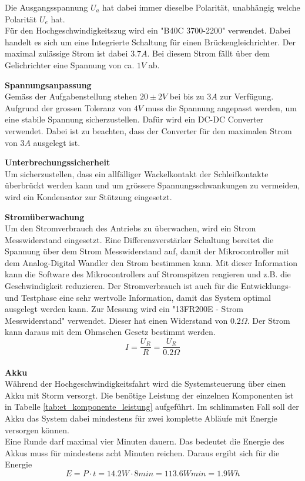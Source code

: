\documentclass[../../main.tex]{subfiles}
\begin{document}
    Die Ausgangsspannung $U_a$ hat dabei immer dieselbe Polarität, unabhängig welche Polarität $U_e$ hat. \\
    Für den Hochgeschwindigkeitszug wird ein "B40C 3700-2200"  verwendet. Dabei handelt es sich um eine Integrierte Schaltung für einen Brückengleichrichter. Der maximal zulässige Strom ist dabei $3.7A$. Bei diesem Strom fällt über dem Gelichrichter eine Spannung von ca. $1V$ ab.

    \textbf{Spannungsanpassung}\\
    Gemäss der Aufgabenstellung stehen $20\pm2V$ bei bis zu $3A$ zur Verfügung. Aufgrund der grossen Toleranz von $4V$ muss die Spannung angepasst werden, um eine stabile Spannung sicherzustellen. Dafür wird ein DC-DC Converter verwendet. Dabei ist zu beachten, dass der Converter für den maximalen Strom von $3A$ ausgelegt ist.

    \textbf{Unterbrechungssicherheit}\\
    Um sicherzustellen, dass ein allfälliger Wackelkontakt der Schleifkontakte überbrückt werden kann und um grössere Spannungsschwankungen zu vermeiden, wird ein Kondensator zur Stützung eingesetzt.

    \textbf{Stromüberwachung}\\
    Um den Stromverbrauch des Antriebs zu überwachen, wird ein Strom Messwiderstand eingesetzt. Eine
    Differenzverstärker Schaltung bereitet die Spannung über dem Strom Messwiderstand auf, damit der Mikrocontroller mit
    dem Analog-Digital Wandler den Strom bestimmen kann. Mit dieser Information kann die Software des Mikrocontrollers
    auf Stromspitzen reagieren und z.B. die Geschwindigkeit reduzieren. Der Stromverbrauch ist auch für die Entwicklungs-
    und Testphase eine sehr wertvolle Information, damit das System optimal ausgelegt werden kann.
    Zur Messung wird ein "13FR200E - Strom Messwiderstand" verwendet. Dieser hat einen Widerstand von $0.2\Omega$. Der Strom kann daraus mit dem Ohmschen Gesetz bestimmt werden. $$I=\frac{U_R}{R}=\frac{U_R}{0.2\Omega} $$
    \\
    \textbf{Akku}\\
    Während der Hochgeschwindigkeitsfahrt wird die Systemsteuerung über einen Akku mit Storm versorgt. Die benötige Leistung der einzelnen Komponenten ist in Tabelle \ref{tab:et_komponente_leistung} aufgeführt. Im schlimmsten Fall soll der Akku das System dabei mindestens für zwei komplette Abläufe mit Energie versorgen können.\\
    Eine Runde darf maximal vier Minuten dauern. Das bedeutet die Energie des Akkus muss für mindestens acht Minuten reichen. Daraus ergibt sich für die Energie $$E=P\cdot t = 14.2W \cdot 8min = 113.6Wmin = 1.9Wh$$
\end{document}
